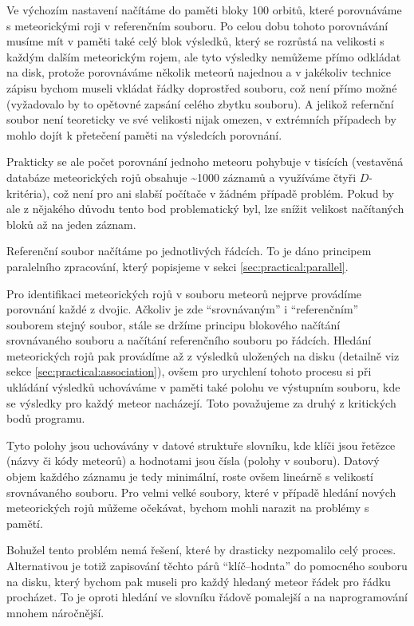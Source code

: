\smallskip

Ve výchozím nastavení načítáme do paměti bloky 100 orbitů, které porovnáváme s meteorickými roji v referenčním souboru. Po celou dobu tohoto porovnávání musíme mít v paměti také celý blok výsledků, který se rozrůstá na velikosti s každým dalším meteorickým rojem, ale tyto výsledky nemůžeme přímo odkládat na disk, protože porovnáváme několik meteorů najednou a v jakékoliv technice zápisu bychom museli vkládat řádky doprostřed souboru, což není přímo možné (vyžadovalo by to opětovné zapsání celého zbytku souboru). A jelikož refernční soubor není teoreticky ve své velikosti nijak omezen, v extrémních případech by mohlo dojít k přetečení paměti na výsledcích porovnání.

Prakticky se ale počet porovnání jednoho meteoru pohybuje v tisících (vestavěná databáze meteorických rojů obsahuje \textasciitilde1000 záznamů a využíváme čtyři $D$-kritéria), což není pro ani slabší počítače v žádném případě problém. Pokud by ale z nějakého důvodu tento bod problematický byl, lze snížit velikost načítaných bloků až na jeden záznam.

\medskip

Referenční soubor načítáme po jednotlivých řádcích. To je dáno principem paralelního zpracování, který popisjeme v sekci \ref{sec:practical:parallel}.

\medskip

Pro identifikaci meteorických rojů v souboru meteorů nejprve provádíme porovnání každé z dvojic. Ačkoliv je zde "`srovnávaným"' i "`referenčním"' souborem stejný soubor, stále se držíme principu blokového načítání srovnávaného souboru a načítání referenčního souboru po řádcích. Hledání meteorických rojů pak provádíme až z výsledků uložených na disku (detailně viz sekce \ref{sec:practical:association}), ovšem pro urychlení tohoto procesu si při ukládání výsledků uchováváme v paměti také polohu ve výstupním souboru, kde se výsledky pro každý meteor nacházejí. Toto považujeme za druhý z kritických bodů programu.

\smallskip

Tyto polohy jsou uchovávány v datové struktuře slovníku, kde klíči jsou řetězce (názvy či kódy meteorů) a hodnotami jsou čísla (polohy v souboru). Datový objem každého záznamu je tedy minimální, roste ovšem lineárně s velikostí srovnávaného souboru. Pro velmi velké soubory, které v případě hledání nových meteorických rojů můžeme očekávat, bychom mohli narazit na problémy s pamětí.

Bohužel tento problém nemá řešení, které by drasticky nezpomalilo celý proces. Alternativou je totiž zapisování těchto párů "`klíč--hodnta"' do pomocného souboru na disku, který bychom pak museli pro každý hledaný meteor řádek pro řádku procházet. To je oproti hledání ve slovníku řádově pomalejší a na naprogramování mnohem náročnější.

